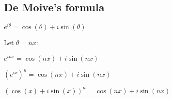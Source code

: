 
\subsection{De Moive's formula}

$e^{i\theta }=\cos (\theta )+i\sin (\theta )$

Let \(\theta = nx\):

$e^{inx }=\cos (nx )+i\sin (nx )$

$(e^{ix})^n=\cos (nx )+i\sin (nx )$

$(\cos (x)+i\sin (x))^n=\cos (nx )+i\sin (nx )$

